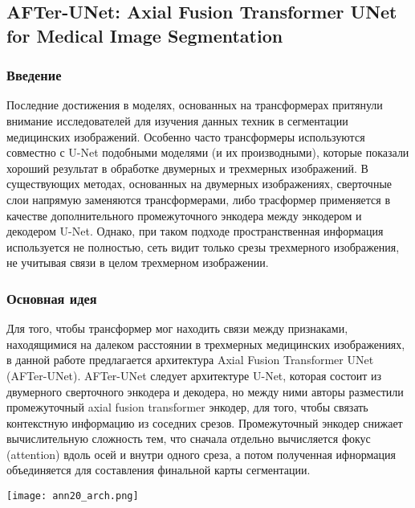 \subsection*{AFTer-UNet: Axial Fusion Transformer UNet for Medical Image Segmentation}

\subsubsection*{Введение}
Последние достижения в моделях, основанных на трансформерах 
притянули внимание исследователей для изучения данных техник 
в сегментации медицинских изображений. Особенно часто трансформеры используются 
совместно с  U-Net \cite{Unet} подобными моделями (и их производными), которые показали 
хороший результат в обработке двумерных и трехмерных изображений.
В существующих методах, основанных на двумерных изображениях, 
сверточные слои напрямую заменяются трансформерами, либо трасформер применяется в 
качестве дополнительного промежуточного энкодера между энкодером и декодером U-Net. 
Однако, при таком подходе пространственная информация используется не полностью, сеть 
видит только срезы трехмерного изображения, не учитывая связи в целом трехмерном изображении.

\subsubsection*{Основная идея}
Для того, чтобы трансформер мог находить связи между признаками, 
находящимися на далеком расстоянии в трехмерных медицинских изображениях,
в данной работе предлагается архитектура Axial Fusion Transformer UNet (AFTer-UNet).
AFTer-UNet \cite{ATerUnet} следует архитектуре U-Net, которая состоит из двумерного сверточного энкодера 
и декодера, но между ними авторы разместили промежуточный axial fusion transformer энкодер, 
для того, чтобы связать контекстную информацию из соседних срезов. Промежуточный 
энкодер снижает вычислительную сложность тем, что сначала отдельно вычисляется 
фокус (attention) вдоль осей и внутри одного среза, а потом полученная ифнормация 
объединяется для составления финальной карты сегментации.
\\
\begin{minipage}{1.0\linewidth}
    \begin{center}
        \texttt{[image: ann20\_arch.png]} \\
    \end{center}
    
\end{minipage}
